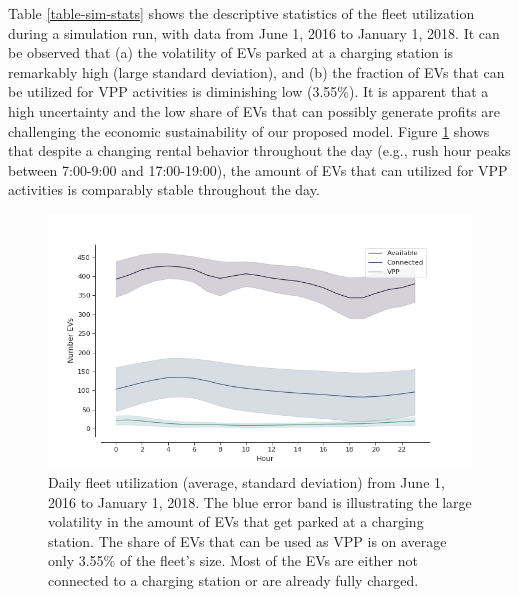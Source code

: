 \documentclass[a4paper, 12pt]{article}
\begin{document}
Table \ref{table-sim-stats} shows the descriptive statistics of the fleet
utilization during a simulation run, with data from June 1, 2016 to January
1, 2018. It can be observed that (a) the volatility of EVs parked at a charging
station is remarkably high (large standard deviation), and (b) the fraction of
EVs that can be utilized for VPP activities is diminishing low (3.55\%). It is
apparent that a high uncertainty and the low share of EVs that can possibly
generate profits are challenging the economic sustainability of our proposed
model. Figure \ref{fig-fleet-utilization} shows that despite a changing rental
behavior throughout the day (e.g., rush hour peaks between 7:00-9:00 and
17:00-19:00), the amount of EVs that can utilized for VPP activities is
comparably stable throughout the day.

\begin{figure}[h]
\centering
\includegraphics[width=1\linewidth]{./fig/fleet-utilization.png}
\caption[Fleet Utilzation]{Daily fleet utilization (average, standard deviation) from June 1, 2016 to January 1, 2018. The blue error band is illustrating the large volatility in the amount of EVs that get parked at a charging station. The share of EVs that can be used as VPP is on average only 3.55\% of the fleet's size. Most of the EVs are either not connected to a charging station or are already fully charged. \label{fig-fleet-utilization}}
\end{figure}
\end{document}
